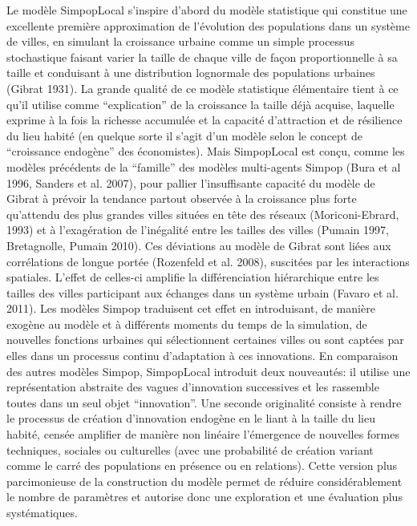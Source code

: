 \documentclass[10pt]{article}
\begin{document}
Le modèle SimpopLocal s’inspire d’abord du modèle statistique qui constitue une excellente première approximation de l’évolution des populations dans un système de villes, en simulant la croissance urbaine comme un simple processus stochastique faisant varier la taille de chaque ville de façon proportionnelle à sa taille et conduisant à une distribution lognormale des populations urbaines (Gibrat 1931). La grande qualité de ce modèle statistique élémentaire tient à ce qu’il utilise comme “explication” de la croissance la taille déjà acquise, laquelle exprime à la fois la richesse accumulée et la capacité d’attraction et de résilience du lieu habité (en quelque sorte il s’agit d’un modèle selon le concept de “croissance endogène” des économistes). Mais SimpopLocal est conçu, comme les modèles précédents de la “famille” des modèles multi-agents Simpop (Bura et al 1996, Sanders et al. 2007), pour pallier l’insuffisante capacité du modèle de Gibrat à prévoir la tendance partout observée à la croissance plus forte qu’attendu des plus grandes villes situées en tête des réseaux (Moriconi-Ebrard, 1993) et à l’exagération de l’inégalité entre les tailles des villes (Pumain 1997, Bretagnolle, Pumain 2010). Ces déviations au modèle de Gibrat sont liées aux corrélations de longue portée (Rozenfeld et al. 2008), suscitées par les interactions spatiales. L’effet de celles-ci amplifie la différenciation hiérarchique entre les tailles des villes participant aux échanges dans un système urbain (Favaro et al. 2011). Les modèles Simpop traduisent cet effet en introduisant, de manière exogène au modèle et à différents moments du temps de la simulation, de nouvelles fonctions urbaines qui sélectionnent certaines villes ou sont captées par elles dans un processus continu d’adaptation à ces innovations. En comparaison des autres modèles Simpop, SimpopLocal introduit deux nouveautés: il utilise une représentation abstraite des vagues d’innovation successives et les rassemble toutes dans un seul objet “innovation”. Une seconde originalité consiste à rendre le processus de création d’innovation endogène en le liant à la taille du lieu habité, censée amplifier de manière non linéaire l’émergence de nouvelles formes techniques, sociales ou culturelles (avec une probabilité de création variant comme le carré des populations en présence ou en relations). Cette version plus parcimonieuse de la construction du modèle permet de réduire considérablement le nombre de paramètres et autorise donc une exploration et une évaluation plus systématiques. 
\end{document}
